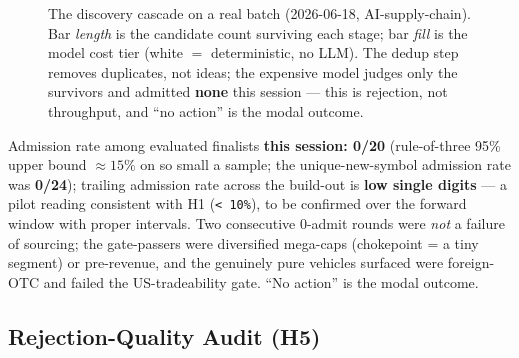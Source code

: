 \documentclass[11pt]{article}
\begin{document}
\begin{figure}[t]
\caption{The discovery cascade on a real batch (2026-06-18, AI-supply-chain). Bar
\emph{length} is the candidate count surviving each stage; bar \emph{fill} is the
model cost tier (white $=$ deterministic, no LLM). The dedup step removes
duplicates, not ideas; the expensive model judges only the survivors and admitted
\textbf{none} this session --- this is rejection, not throughput, and ``no action''
is the modal outcome.}
\label{fig:cascade}
\end{figure}

Admission rate among evaluated finalists \textbf{this session: 0/20}
(rule-of-three 95\% upper bound $\approx 15\%$ on so small a sample; the
unique-new-symbol admission rate was \textbf{0/24}); trailing
admission rate across the build-out is \textbf{low single digits} --- a pilot
reading consistent with H1 (\texttt{< 10\%}), to be confirmed over the forward
window with proper intervals.
Two consecutive 0-admit rounds were \emph{not} a failure of sourcing; the
gate-passers were diversified mega-caps (chokepoint = a tiny segment) or
pre-revenue, and the genuinely pure vehicles surfaced were foreign-OTC and
failed the US-tradeability gate.
``No action'' is the modal outcome.

\subsection{Rejection-Quality Audit (H5)}
\end{document}
